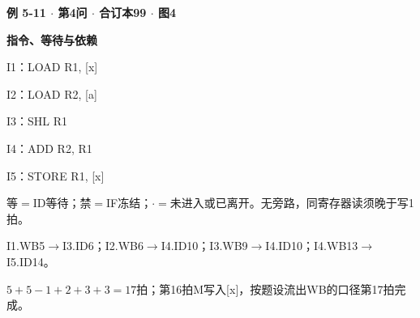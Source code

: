 {\color{ink}\bfseries 例 5-11 \(\cdot \) 第4问 \(\cdot \) 合订本99 \(\cdot \) 图4}\par \textbf{指令、等待与依赖}\par\vspace{2bp}I1：LOAD R1,\allowbreak{} [x]\par I2：LOAD R2,\allowbreak{} [a]\par I3：SHL R1\par I4：ADD R2,\allowbreak{} R1\par I5：STORE R1,\allowbreak{} [x]\par 等\(=\allowbreak{}\)ID等待；禁\(=\allowbreak{}\)IF冻结；\(\cdot \)\(=\allowbreak{}\)未进入或已离开。无旁路，同寄存器读须晚于写1拍。\par I1.WB5\(\to \)I3.ID6；I2.WB6\(\to \)I4.ID10；I3.WB9\(\to \)I4.ID10；I4.WB13\(\to \)I5.ID14。\par \(5+\allowbreak{}5-1+\allowbreak{}2+\allowbreak{}3+\allowbreak{}3=\allowbreak{}17\)拍；第16拍M写入[x]，按题设流出WB的口径第17拍完成。
